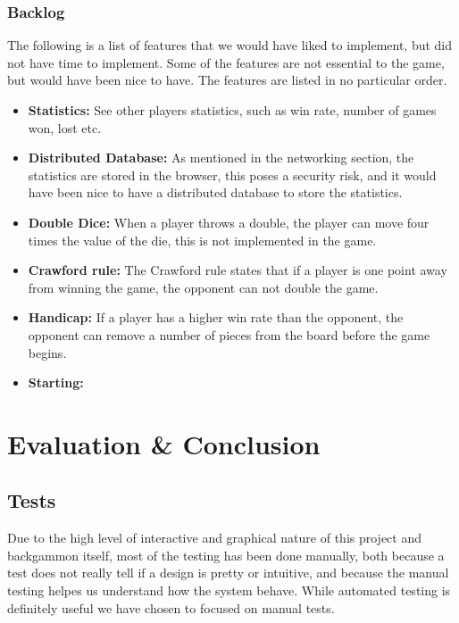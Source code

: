 \documentclass[ twoside,openright,titlepage,numbers=noenddot,headinclude,%
                footinclude=true,cleardoublepage=empty,abstractoff, %
                BCOR=5mm,paper=a4,fontsize=11pt,%
                ngerman,american,%
                ]{scrreprt}
\begin{document}
\subsection{Backlog}
The following is a list of features that we would have liked to implement, but did not have time to implement. Some of the features are not essential to the game, but would have been nice to have. The features are listed in no particular order.
\begin{itemize}
  \item \textbf{Statistics:} See other players statistics, such as win rate, number of games won, lost etc. 
  \item \textbf{Distributed Database:} As mentioned in the networking section, the statistics are stored in the browser, this poses a security risk, and it would have been nice to have a distributed database to store the statistics.
  \item \textbf{Double Dice:} When a player throws a double, the player can move four times the value of the die, this is not implemented in the game.
  \item \textbf{Crawford rule:} The Crawford rule states that if a player is one point away from winning the game, the opponent can not double the game. 
  \item \textbf{Handicap:} If a player has a higher win rate than the opponent, the opponent can remove a number of pieces from the board before the game begins.
  \item \textbf{Starting:}
\end{itemize}




\chapter{Evaluation \& Conclusion}
\label{cha:evaluation}

\section{Tests}
Due to the high level of interactive and graphical nature of this project and backgammon itself, most of the testing has been done manually, both because a test does not really tell if a design is pretty or intuitive, and because the manual testing helpes us understand how the system behave. While automated testing is definitely useful we have chosen to focused on manual tests. 
\end{document}
